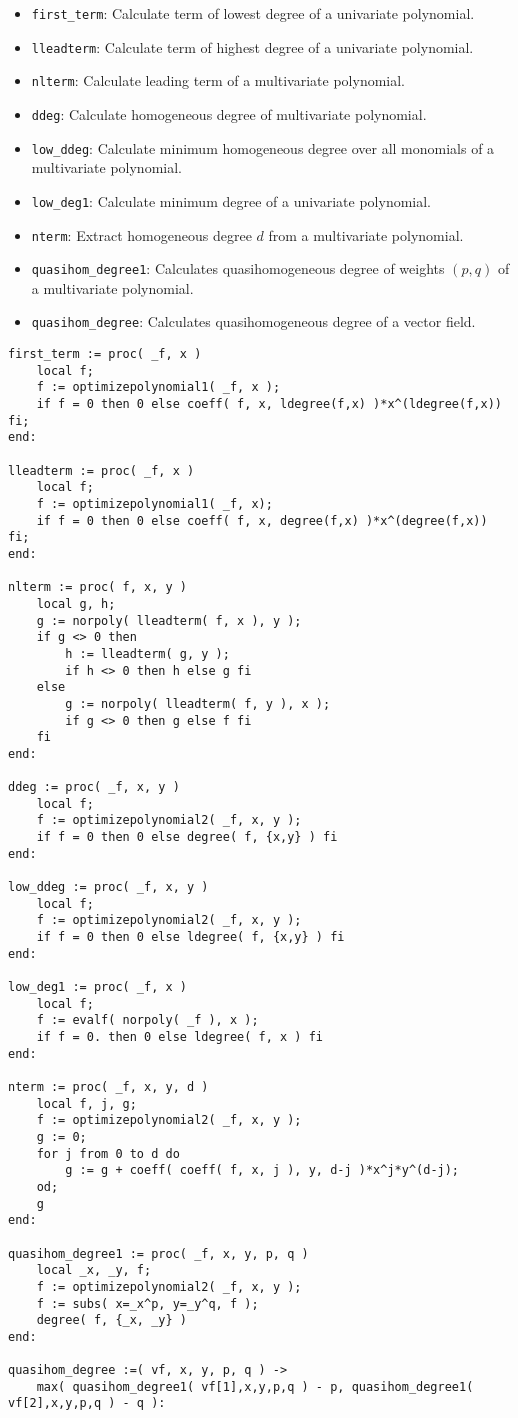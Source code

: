 \documentclass[a4paper,10pt]{article}
\begin{document}
\begin{itemize}
\item   \verb+first_term+:   Calculate term of lowest degree of a univariate polynomial.
\item   \verb+lleadterm+:    Calculate term of highest degree of a univariate polynomial.
\item   \verb+nlterm+:       Calculate leading term of a multivariate polynomial.
\item   \verb+ddeg+:         Calculate homogeneous degree of multivariate polynomial.
\item   \verb+low_ddeg+:    Calculate minimum homogeneous degree over all monomials of a multivariate polynomial.
\item   \verb+low_deg1+:     Calculate minimum degree of a univariate polynomial.
\item   \verb+nterm+:       Extract homogeneous degree $d$ from a multivariate polynomial.
\item   \verb+quasihom_degree1+: Calculates quasihomogeneous degree of weights $(p,q)$ of a multivariate polynomial.
\item   \verb+quasihom_degree+: Calculates quasihomogeneous degree of a vector field.
\end{itemize}

\begin{lstlisting}[name=tools]
first_term := proc( _f, x )
    local f;
    f := optimizepolynomial1( _f, x );
    if f = 0 then 0 else coeff( f, x, ldegree(f,x) )*x^(ldegree(f,x)) fi;
end:

lleadterm := proc( _f, x )
    local f;
    f := optimizepolynomial1( _f, x);
    if f = 0 then 0 else coeff( f, x, degree(f,x) )*x^(degree(f,x)) fi;
end:

nlterm := proc( f, x, y )
    local g, h;
    g := norpoly( lleadterm( f, x ), y );
    if g <> 0 then
        h := lleadterm( g, y );
        if h <> 0 then h else g fi
    else
        g := norpoly( lleadterm( f, y ), x );
        if g <> 0 then g else f fi
    fi
end:

ddeg := proc( _f, x, y )
    local f;
    f := optimizepolynomial2( _f, x, y );
    if f = 0 then 0 else degree( f, {x,y} ) fi
end:

low_ddeg := proc( _f, x, y )
    local f;
    f := optimizepolynomial2( _f, x, y );
    if f = 0 then 0 else ldegree( f, {x,y} ) fi
end:

low_deg1 := proc( _f, x )
    local f;
    f := evalf( norpoly( _f ), x );
    if f = 0. then 0 else ldegree( f, x ) fi
end:

nterm := proc( _f, x, y, d )
    local f, j, g;
    f := optimizepolynomial2( _f, x, y );
    g := 0;
    for j from 0 to d do
        g := g + coeff( coeff( f, x, j ), y, d-j )*x^j*y^(d-j);
    od;
    g
end:

quasihom_degree1 := proc( _f, x, y, p, q )
    local _x, _y, f;
    f := optimizepolynomial2( _f, x, y );
    f := subs( x=_x^p, y=_y^q, f );
    degree( f, {_x, _y} )
end:

quasihom_degree :=( vf, x, y, p, q ) ->
    max( quasihom_degree1( vf[1],x,y,p,q ) - p, quasihom_degree1( vf[2],x,y,p,q ) - q ):
\end{lstlisting}
\end{document}
